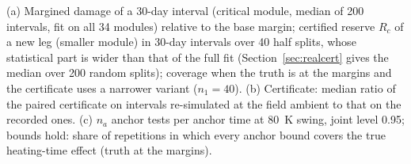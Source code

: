 \begin{table}[htbp]
\smallskip
\begin{minipage}{\textwidth}\scriptsize
(a) Margined damage of a 30-day interval (critical module, median of 200 intervals, fit on all 34 modules) relative to
the base margin; certified reserve $R_c$ of a new leg (smaller module) in 30-day intervals over 40 half splits, whose
statistical part is wider than that of the full fit (Section~\ref{sec:realcert} gives the median over 200 random splits); coverage when the truth is at the margins and the certificate uses
a narrower variant ($n_1=40$). (b) Certificate: median ratio of the paired certificate on intervals re-simulated at the
field ambient to that on the recorded ones. (c) $n_a$ anchor tests per anchor time at 80~K swing, joint level 0.95;
bounds hold: share of repetitions in which every anchor bound covers the true heating-time effect (truth at the
margins).
\end{minipage}
\end{table}
